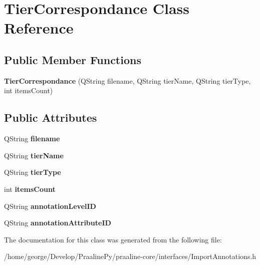 \hypertarget{class_tier_correspondance}{}\section{Tier\+Correspondance Class Reference}
\label{class_tier_correspondance}
\subsection*{Public Member Functions}
\begin{DoxyCompactItemize}
\item 
\mbox{\label{class_tier_correspondance_a86f8fa6515187f3a6a6411a2854cbdfb}} 
{\bfseries Tier\+Correspondance} (Q\+String filename, Q\+String tier\+Name, Q\+String tier\+Type, int items\+Count)
\end{DoxyCompactItemize}
\subsection*{Public Attributes}
\begin{DoxyCompactItemize}
\item 
\mbox{\label{class_tier_correspondance_a735c723846b6f2440e8ec018322261af}} 
Q\+String {\bfseries filename}
\item 
\mbox{\label{class_tier_correspondance_a277548fcbadcb40494f21607c4c79083}} 
Q\+String {\bfseries tier\+Name}
\item 
\mbox{\label{class_tier_correspondance_ab8e344646a87d1dc6436a4f419e04d38}} 
Q\+String {\bfseries tier\+Type}
\item 
\mbox{\label{class_tier_correspondance_a11fb6832ce38d988d90aa2018ba427d9}} 
int {\bfseries items\+Count}
\item 
\mbox{\label{class_tier_correspondance_a24d59b11de7dc21996a9e4d7602609af}} 
Q\+String {\bfseries annotation\+Level\+ID}
\item 
\mbox{\label{class_tier_correspondance_a715b859bdb5ec79ae2d2b9c896e1f35f}} 
Q\+String {\bfseries annotation\+Attribute\+ID}
\end{DoxyCompactItemize}


The documentation for this class was generated from the following file\+:\begin{DoxyCompactItemize}
\item 
/home/george/\+Develop/\+Praaline\+Py/praaline-\/core/interfaces/Import\+Annotations.\+h\end{DoxyCompactItemize}
